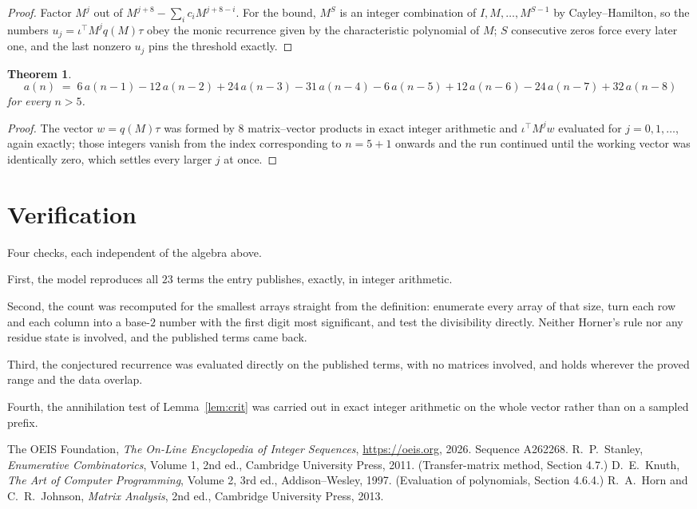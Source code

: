 \documentclass[11pt,a4paper]{article}
\theoremstyle{plain}
\newtheorem{theorem}{Theorem}
\theoremstyle{definition}
\begin{document}
\begin{proof}
Factor $M^{j}$ out of $M^{j+8}-\sum_ic_iM^{j+8-i}$. For the bound, $M^{S}$
is an integer combination of $I,M,\dots,M^{S-1}$ by Cayley--Hamilton, so the numbers
$u_j=\iota^{\!\top}M^{j}q(M)\tau$ obey the monic recurrence given by the characteristic
polynomial of $M$; $S$ consecutive zeros force every later one, and the last nonzero $u_j$
pins the threshold exactly.
\end{proof}

\begin{theorem}
\[
a(n)\;=\;6\,a(n-1) - 12\,a(n-2) + 24\,a(n-3) - 31\,a(n-4) - 6\,a(n-5) + 12\,a(n-6) - 24\,a(n-7) + 32\,a(n-8)
\]
for every $n>5$.
\end{theorem}

\begin{proof}
The vector $w=q(M)\tau$ was formed by $8$ matrix--vector products in exact integer
arithmetic and $\iota^{\!\top}M^{j}w$ evaluated for $j=0,1,\dots$, again exactly; those
integers vanish from the index corresponding to $n=5+1$ onwards and the run continued
until the working vector was identically zero, which settles every larger $j$ at once.
\end{proof}

\section{Verification}

Four checks, each independent of the algebra above.

First, the model reproduces all $23$ terms the entry publishes, exactly, in integer
arithmetic.

Second, the count was recomputed for the smallest arrays straight from the definition:
enumerate every array of that size, turn each row and each column into a base-$2$ number with
the first digit most significant, and test the divisibility directly. Neither Horner's rule nor
any residue state is involved, and the published terms came back.

Third, the conjectured recurrence was evaluated directly on the published terms, with no
matrices involved, and holds wherever the proved range and the data overlap.

Fourth, the annihilation test of Lemma~\ref{lem:crit} was carried out in exact integer
arithmetic on the whole vector rather than on a sampled prefix.

\begin{thebibliography}{9}
 The OEIS Foundation, \emph{The On-Line Encyclopedia of Integer
Sequences}, \url{https://oeis.org}, 2026. Sequence A262268.
 R.~P.~Stanley, \emph{Enumerative Combinatorics}, Volume 1, 2nd ed.,
Cambridge University Press, 2011. (Transfer-matrix method, Section 4.7.)
 D.~E.~Knuth, \emph{The Art of Computer Programming}, Volume 2, 3rd ed.,
Addison--Wesley, 1997. (Evaluation of polynomials, Section 4.6.4.)
 R.~A.~Horn and C.~R.~Johnson, \emph{Matrix Analysis}, 2nd ed., Cambridge
University Press, 2013.
\end{thebibliography}
\end{document}
